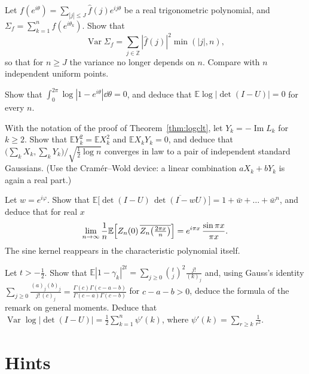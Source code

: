 \begin{exercise}[$\star\star$]\label{ex:linearstat}
Let $f(e^{i\theta})=\sum_{|j|\le J}\hat f(j)e^{ij\theta}$ be a real trigonometric polynomial, and $\Sigma_f=\sum_{k=1}^nf(e^{i\theta_k})$. Show that
\[
\operatorname{Var}\Sigma_f=\sum_{j\in\mathbb Z}|\hat f(j)|^2\min(|j|,n),
\]
so that for $n\ge J$ the variance no longer depends on $n$. Compare with $n$ independent uniform points.
\end{exercise}

\begin{exercise}[$\star\star$]\label{ex:meanlog}
Show that $\int_0^{2\pi}\log|1-e^{i\theta}|\dd\theta=0$, and deduce that $\mathbb E\log|\det(I-U)|=0$ for every $n$.
\end{exercise}

\begin{exercise}[$\star\star$]\label{ex:argclt}
With the notation of the proof of Theorem~\ref{thm:logclt}, let $Y_k=-\operatorname{Im}L_k$ for $k\ge2$. Show that $\mathbb EY_k^2=\mathbb EX_k^2$ and $\mathbb EX_kY_k=0$, and deduce that $\bigl(\sum_kX_k,\sum_kY_k\bigr)/\sqrt{\frac12\log n}$ converges in law to a
pair of independent standard Gaussians. (Use the Cram\'er--Wold device: a linear combination $aX_k+bY_k$ is again a real part.)
\end{exercise}

\begin{exercise}[$\star\star\star$]\label{ex:ratio}
Let $w=e^{i\varphi}$. Show that $\mathbb E\bigl[\det(I-U)\,\overline{\det(I-wU)}\bigr]=1+\bar w+\dots+\bar w^n$, and deduce that for real $x$
\[
\lim_{n\to\infty}\frac1n\mathbb E\Bigl[Z_n(0)\,\overline{Z_n\bigl(\tfrac{2\pi x}n\bigr)}\Bigr]=e^{i\pi x}\,\frac{\sin\pi x}{\pi x}.
\]
The sine kernel reappears in the characteristic polynomial itself.
\end{exercise}

\begin{exercise}[$\star\star\star$]\label{ex:kstreal}
Let $t>-\frac12$. Show that $\mathbb E|1-\gamma_k|^{2t}=\sum_{j\ge0}\binom tj^2\frac{j!}{(k)_j}$ and, using Gauss's identity $\sum_{j\ge0}\frac{(a)_j(b)_j}{j!\,(c)_j}=\frac{\Gamma(c)\Gamma(c-a-b)}{\Gamma(c-a)\Gamma(c-b)}$ for $c-a-b>0$, deduce the
formula of the remark on general moments. Deduce that $\operatorname{Var}\log|\det(I-U)|=\frac12\sum_{k=1}^n\psi'(k)$, where $\psi'(k)=\sum_{r\ge k}\frac1{r^2}$.
\end{exercise}

\section{Hints}

